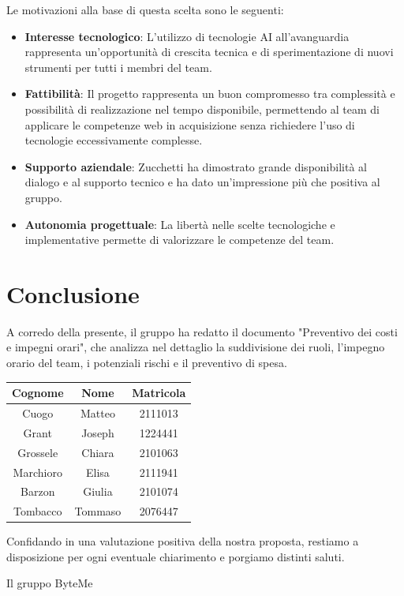 \documentclass[11pt,a4paper]{article}
\begin{document}
Le motivazioni alla base di questa scelta sono le seguenti:
\begin{itemize}
    \item \textbf{Interesse tecnologico}: L'utilizzo di tecnologie AI all'avanguardia rappresenta un'opportunità di crescita tecnica e di sperimentazione di nuovi strumenti per tutti i membri del team.
    \item \textbf{Fattibilità}: Il progetto rappresenta un buon compromesso tra complessità e possibilità di realizzazione nel tempo disponibile, permettendo al team di applicare le competenze web in acquisizione senza richiedere l'uso di tecnologie eccessivamente complesse.
    \item \textbf{Supporto aziendale}: Zucchetti ha dimostrato grande disponibilità al dialogo e al supporto tecnico e ha dato un'impressione più che positiva al gruppo.
    \item \textbf{Autonomia progettuale}: La libertà nelle scelte tecnologiche e implementative permette di valorizzare le competenze del team.
\end{itemize}

\newpage
\section{Conclusione}
A corredo della presente, il gruppo ha redatto il documento "Preventivo dei costi e impegni orari", che analizza nel dettaglio la suddivisione dei ruoli, l'impegno orario del team, i potenziali rischi e il preventivo di spesa.

\begin{table}[H]
    \centering
    \begin{tabular}{|c|c|c|}
        \hline
        \textbf{Cognome} & \textbf{Nome} & \textbf{Matricola} \\
        \hline
        Cuogo & Matteo & 2111013 \\
        \hline
        Grant & Joseph & 1224441 \\
        \hline
        Grossele & Chiara & 2101063 \\
        \hline
        Marchioro & Elisa & 2111941 \\
        \hline
        Barzon & Giulia & 2101074 \\
        \hline
        Tombacco & Tommaso & 2076447 \\
        \hline
    \end{tabular}
\end{table}

\noindent Confidando in una valutazione positiva della nostra proposta, restiamo a disposizione per ogni eventuale chiarimento e porgiamo distinti saluti.

\hfill Il gruppo ByteMe
\end{document}
